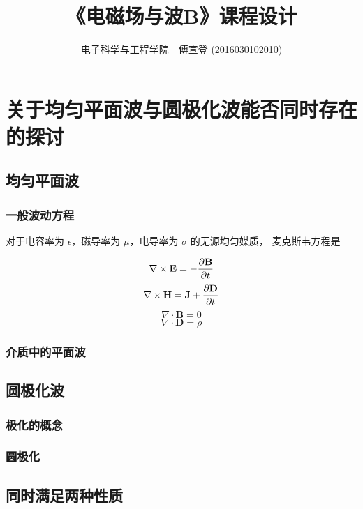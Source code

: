 \documentclass[UTF8,linespread=1.236]{ctexart}
\newcommand\pypx[2]{{{\partial {#1}} \over {\partial {#2}}}}
\begin{document}
\title{《电磁场与波B》课程设计}
\author{电子科学与工程学院\ \ 傅宣登 (2016030102010)}

\maketitle

\section{关于均匀平面波与圆极化波能否同时存在的探讨}

\subsection{均匀平面波}

\subsubsection{一般波动方程}

对于电容率为 $\epsilon$，磁导率为 $\mu$，电导率为 $\sigma$
的无源均匀媒质，
麦克斯韦方程是

\begin{equation}%
    \nabla \times \mathbf{E} = - \pypx{\mathbf{B}}{t}
\end{equation}
\begin{equation}
    \nabla \times \mathbf{H} = \mathbf{J} + \pypx{\mathbf{D}}{t}
\end{equation}
\begin{equation}
    \nabla \cdot \mathbf{B} = 0
\end{equation}
\begin{equation}
    \nabla \cdot \mathbf{D} = \rho
\end{equation}

\subsubsection{介质中的平面波}

\subsection{圆极化波}

\subsubsection{极化的概念}

\subsubsection{圆极化}

\subsection{同时满足两种性质}


\end{document}
